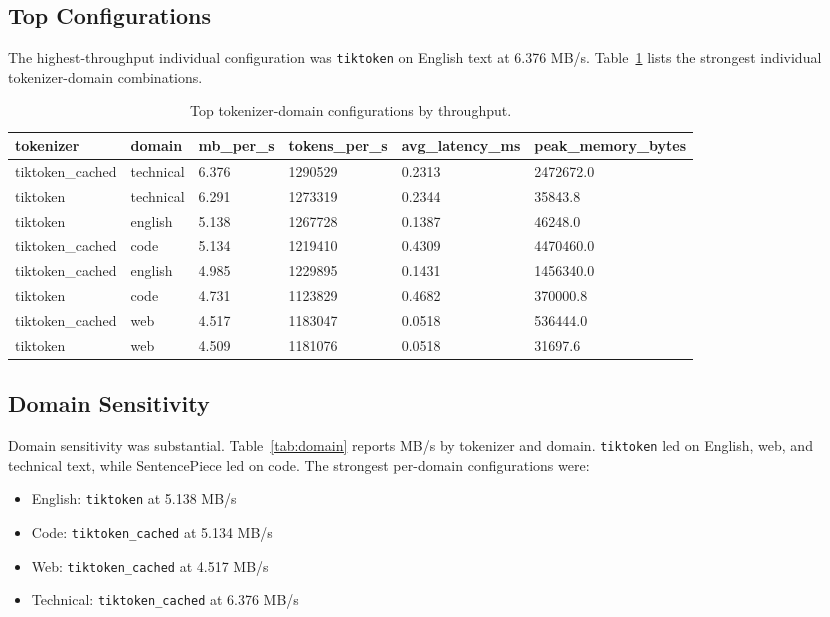 \documentclass[11pt]{article}
\begin{document}
\subsection{Top Configurations}
The highest-throughput individual configuration was \texttt{tiktoken} on English text at 6.376 MB/s. Table~\ref{tab:topconfigs} lists the strongest individual tokenizer-domain combinations.

\begin{table}[H]
\centering
\begin{tabular}{llllll}
\toprule
tokenizer & domain & mb\_per\_s & tokens\_per\_s & avg\_latency\_ms & peak\_memory\_bytes \\
\midrule
tiktoken\_cached & technical & 6.376 & 1290529 & 0.2313 & 2472672.0 \\
tiktoken & technical & 6.291 & 1273319 & 0.2344 & 35843.8 \\
tiktoken & english & 5.138 & 1267728 & 0.1387 & 46248.0 \\
tiktoken\_cached & code & 5.134 & 1219410 & 0.4309 & 4470460.0 \\
tiktoken\_cached & english & 4.985 & 1229895 & 0.1431 & 1456340.0 \\
tiktoken & code & 4.731 & 1123829 & 0.4682 & 370000.8 \\
tiktoken\_cached & web & 4.517 & 1183047 & 0.0518 & 536444.0 \\
tiktoken & web & 4.509 & 1181076 & 0.0518 & 31697.6 \\
\bottomrule
\end{tabular}
\caption{Top tokenizer-domain configurations by throughput.}
\label{tab:topconfigs}
\end{table}

\subsection{Domain Sensitivity}
Domain sensitivity was substantial. Table~\ref{tab:domain} reports MB/s by tokenizer and domain. \texttt{tiktoken} led on English, web, and technical text, while SentencePiece led on code. The strongest per-domain configurations were:
\begin{itemize}
\item English: \texttt{tiktoken} at 5.138 MB/s
\item Code: \texttt{tiktoken\_cached} at 5.134 MB/s
\item Web: \texttt{tiktoken\_cached} at 4.517 MB/s
\item Technical: \texttt{tiktoken\_cached} at 6.376 MB/s
\end{itemize}
\end{document}
